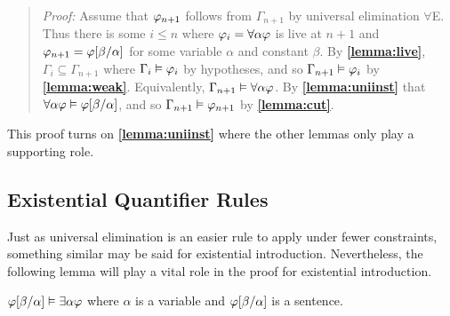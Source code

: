 
\begin{quote} 
  \textit{Proof:} Assume that $\varphi_{n+1}$ follows from $\Gamma_{n+1}$ by universal elimination $\forall$E.
  Thus there is some $i\leq n$ where $\varphi_i=\forall \alpha\varphi$ is live at $n+1$ and $\varphi_{n+1}=\varphi[\beta/\alpha]$ for some variable $\alpha$ and constant $\beta$.
  By \textbf{\ref{lemma:live}}, $\Gamma_i\subseteq \Gamma_{n+1}$ where $\Gamma_i\vDash\varphi_i$ by hypotheses, and so $\Gamma_{n+1} \vDash \varphi_i$ by \textbf{\ref{lemma:weak}}.
  Equivalently, $\Gamma_{n+1} \vDash \forall \alpha\varphi$.
  By \textbf{\ref{lemma:uniinst}} that $\forall \alpha\varphi\vDash \varphi[\beta/\alpha]$, and so $\Gamma_{n+1}\vDash\varphi_{n+1}$ by \textbf{\ref{lemma:cut}}.
\end{quote}

This proof turns on \textbf{\ref{lemma:uniinst}} where the other lemmas only play a supporting role.





\subsection{Existential Quantifier Rules}%
  \label{sub:ExistentialRules}
 
Just as universal elimination is an easier rule to apply under fewer constraints, something similar may be said for existential introduction.
Nevertheless, the following lemma will play a vital role in the proof for existential introduction.

\begin{Lthm} \label{lemma:exigen}
  $\varphi[\beta/\alpha] \vDash \exists\alpha\varphi$ where $\alpha$ is a variable and $\varphi[\beta/\alpha]$ is a sentence. 
\end{Lthm}

